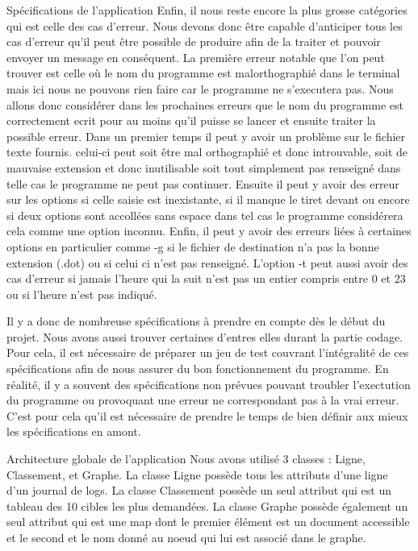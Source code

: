 \documentclass{article}
\begin{document}
\begin{section}{Spécifications de l'application}
Enfin, il nous reste encore la plus grosse catégories qui est celle des cas d'erreur. Nous devons donc être capable d'anticiper tous les cas d'erreur qu'il peut être possible de produire afin de la traiter et pouvoir envoyer un message en conséquent.
La première erreur notable que l'on peut trouver est celle où le nom du programme est malorthographié dans le terminal mais ici nous ne pouvons rien faire car le programme ne s'executera pas. Nous allons donc considérer dans les prochaines erreurs que le nom du programme est correctement ecrit pour au moins qu'il puisse se lancer et ensuite traiter la possible erreur.
Dans un premier temps il peut y avoir un problème sur le fichier texte fournis. celui-ci peut soit être mal orthographié et donc introuvable, soit de mauvaise extension et donc inutilisable soit tout simplement pas renseigné dans telle cas le programme ne peut pas continuer.
Ensuite il peut y avoir des erreur sur les options si celle saisie est inexistante, si il manque le tiret devant ou encore si deux options sont accollées sans espace dans tel cas le programme considérera cela comme une option inconnu.
Enfin, il peut y avoir des erreurs liées à certaines options en particulier comme -g si le fichier de destination n'a pas la bonne extension (.dot) ou si celui ci n'est pas renseigné. L'option -t peut aussi avoir des cas d'erreur si jamais l'heure qui la suit n'est pas un entier compris entre 0 et 23 ou si l'heure n'est pas indiqué.

Il y a donc de nombreuse spécifications à prendre en compte dès le début du projet. Nous avons aussi trouver certaines d'entres elles durant la partie codage. Pour cela, il est nécessaire de préparer un jeu de test couvrant l'intégralité de ces spécifications afin de nous assurer du bon fonctionnement du programme.
En réalité, il y a souvent des spécifications non prévues  pouvant troubler l'exectution du programme ou provoquant une erreur ne correspondant pas à la vrai erreur. C'est pour cela qu'il est nécessaire de prendre le temps de bien définir aux mieux les spécifications en amont.
\end{section}

\begin{section}{Architecture globale de l'application}
Nous avons utilisé 3 classes : Ligne, Classement, et Graphe. La classe Ligne possède tous les attributs d'une ligne d'un journal de logs. La classe Classement possède un seul attribut qui est un tableau des 10 cibles les plus demandées. La classe Graphe possède également un seul attribut qui est une map dont le premier élément est un document accessible et le second et le nom donné au noeud qui lui est associé dans le graphe.
\end{section}
\end{document}
